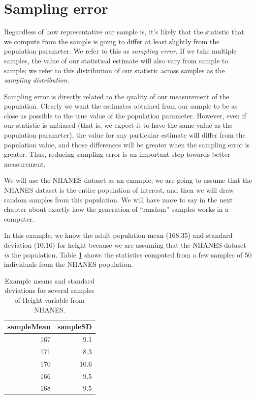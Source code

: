 \documentclass[
  12pt,
]{book}
\begin{document}
\hypertarget{samplingerror}{%
\section{Sampling error}\label{samplingerror}}

Regardless of how representative our sample is, it's likely that the statistic that we compute from the sample is going to differ at least slightly from the population parameter. We refer to this as \emph{sampling error}. If we take multiple samples, the value of our statistical estimate will also vary from sample to sample; we refer to this distribution of our statistic across samples as the \emph{sampling distribution}.

Sampling error is directly related to the quality of our measurement of the population. Clearly we want the estimates obtained from our sample to be as close as possible to the true value of the population parameter. However, even if our statistic is unbiased (that is, we expect it to have the same value as the population parameter), the value for any particular estimate will differ from the population value, and those differences will be greater when the sampling error is greater. Thus, reducing sampling error is an important step towards better measurement.

We will use the NHANES dataset as an example; we are going to assume that the NHANES dataset is the entire population of interest, and then we will draw random samples from this population. We will have more to say in the next chapter about exactly how the generation of ``random'' samples works in a computer.

In this example, we know the adult population mean (168.35) and standard deviation (10.16) for height because we are assuming that the NHANES dataset \emph{is} the population. Table \ref{tab:sampleExample} shows the statistics computed from a few samples of 50 individuals from the NHANES population.

\begin{table}

\caption{\label{tab:sampleExample}Example means and standard deviations for several samples of Height variable from NHANES.}
\centering
\begin{tabular}[t]{r|r}
\hline
sampleMean & sampleSD\\
\hline
167 & 9.1\\
\hline
171 & 8.3\\
\hline
170 & 10.6\\
\hline
166 & 9.5\\
\hline
168 & 9.5\\
\hline
\end{tabular}
\end{table}
\end{document}
